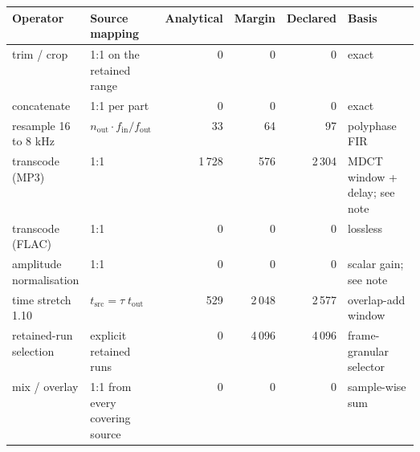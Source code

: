 \begin{tabular}{p{0.19\linewidth}p{0.19\linewidth}rrrp{0.21\linewidth}}
\toprule
Operator & Source mapping & Analytical & Margin & Declared & Basis \\
\midrule
trim / crop & 1:1 on the retained range & 0 & 0 & 0 & exact \\
concatenate & 1:1 per part & 0 & 0 & 0 & exact \\
resample 16 to 8 kHz & $n_\mathrm{out}\!\cdot\!f_\mathrm{in}/f_\mathrm{out}$ & 33 & 64 & 97 & polyphase FIR \\
transcode (MP3) & 1:1 & 1\,728 & 576 & 2\,304 & MDCT window + delay; see note \\
transcode (FLAC) & 1:1 & 0 & 0 & 0 & lossless \\
amplitude normalisation & 1:1 & 0 & 0 & 0 & scalar gain; see note \\
time stretch 1.10 & $t_\mathrm{src}=\tau\; t_\mathrm{out}$ & 529 & 2\,048 & 2\,577 & overlap-add window \\
retained-run selection & explicit retained runs & 0 & 4\,096 & 4\,096 & frame-granular selector \\
mix / overlay & 1:1 from every covering source & 0 & 0 & 0 & sample-wise sum \\
\bottomrule
\end{tabular}
